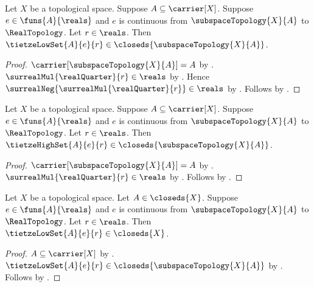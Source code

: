 \begin{theorem}\label{tietze_low_set_closed_in_subspace}
    Let $X$ be a topological space.
    Suppose $A\subseteq\carrier[X]$.
    Suppose $e\in\funs{A}{\reals}$ and
        $e$ is continuous from $\subspaceTopology{X}{A}$ to
            $\RealTopology$.
    Let $r\in\reals$.
    Then $\tietzeLowSet{A}{e}{r}
        \in\closeds{\subspaceTopology{X}{A}}$.
\end{theorem}
\begin{proof}
    $\carrier[\subspaceTopology{X}{A}]=A$
        by .
    $\surrealMul{\realQuarter}{r}\in\reals$
        by .
    Hence $\surrealNeg{\surrealMul{\realQuarter}{r}}\in\reals$
        by .
    Follows by
        .
\end{proof}

\begin{theorem}\label{tietze_high_set_closed_in_subspace}
    Let $X$ be a topological space.
    Suppose $A\subseteq\carrier[X]$.
    Suppose $e\in\funs{A}{\reals}$ and
        $e$ is continuous from $\subspaceTopology{X}{A}$ to
            $\RealTopology$.
    Let $r\in\reals$.
    Then $\tietzeHighSet{A}{e}{r}
        \in\closeds{\subspaceTopology{X}{A}}$.
\end{theorem}
\begin{proof}
    $\carrier[\subspaceTopology{X}{A}]=A$
        by .
    $\surrealMul{\realQuarter}{r}\in\reals$
        by .
    Follows by
        .
\end{proof}

\begin{corollary}\label{tietze_low_set_closed}
    Let $X$ be a topological space.
    Let $A\in\closeds{X}$.
    Suppose $e\in\funs{A}{\reals}$ and
        $e$ is continuous from $\subspaceTopology{X}{A}$ to
            $\RealTopology$.
    Let $r\in\reals$.
    Then $\tietzeLowSet{A}{e}{r}\in\closeds{X}$.
\end{corollary}
\begin{proof}
    $A\subseteq\carrier[X]$ by .
    $\tietzeLowSet{A}{e}{r}
        \in\closeds{\subspaceTopology{X}{A}}$
        by .
    Follows by .
\end{proof}


